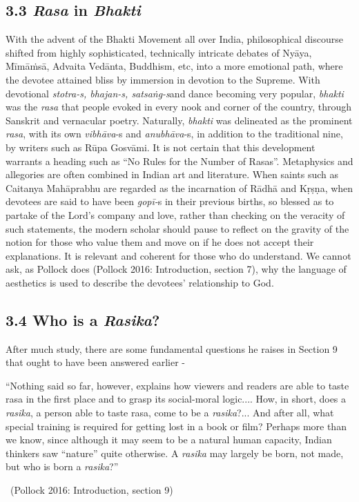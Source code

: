 \vspace{-.3cm}

\subsection*{3.3 \textit{Rasa} in \textit{Bhakti}}

With the advent of the Bhakti Movement all over India, philosophical discourse shifted from highly sophisticated, technically intricate debates of Nyāya, Mīmāṁsā, Advaita Vedānta, Buddhism, etc, into a more emotional path, where the devotee attained bliss by immersion in devotion to the Supreme. With devotional \textit{stotra-s, bhajan-s, satsaṅg-s}\break and dance becoming very popular, \textit{bhakti} was the \textit{rasa} that people evoked in every nook and corner of the country, through Sanskrit and vernacular poetry. Naturally, \textit{bhakti} was delineated as the prominent \textit{rasa}, with its own \textit{vibhāva}-s and \textit{anubhāva}-s, in addition to the traditional nine, by writers such as Rūpa Gosvāmi. It is not certain that this development warrants a heading such as “No Rules for the Number of Rasas”. Metaphysics and allegories are often combined in Indian art and literature. When saints such as Caitanya Mahāprabhu are regarded as the incarnation of Rādhā and Kṛṣṇa, when devotees are said to have been \textit{gopī-}s in their previous births, so blessed as to partake of the Lord’s company and love, rather than checking on the veracity of such statements, the modern scholar should pause to reflect on the gravity of the notion for those who value them and move on if he does not accept their explanations. It is relevant and coherent for those who do understand. We cannot ask, as Pollock does (Pollock 2016: Introduction, section 7), why the language of aesthetics is used to describe the devotees’ relationship to God.


\subsection*{3.4 Who is a \textit{Rasika}?}

After much study, there are some fundamental questions he raises in Section 9 that ought to have been answered earlier -

\begin{myquote}
“Nothing said so far, however, explains how viewers and readers are able to taste rasa in the first place and to grasp its social-moral logic.... How, in short, does a \textit{rasika}, a person able to taste rasa, come to be a \textit{rasika}?... And after all, what special training is required for getting lost in a book or film? Perhaps more than we know, since although it may seem to be a natural human capacity, Indian thinkers saw “nature” quite otherwise. A \textit{rasika} may largely be born, not made, but who is born a \textit{rasika}?” 

~\hfill (Pollock 2016: Introduction, section 9)
\end{myquote}

